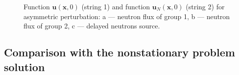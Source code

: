 \documentclass[authoryear]{elsarticle}
\begin{document}
\begin{figure}[!h]
\begin{center}
\begin{minipage}{0.3\linewidth}
 \\
\end{minipage}

\begin{minipage}{0.051\linewidth}
\center{~} \\
\end{minipage}
\hfill
\begin{minipage}{0.3\linewidth}
 \\
\end{minipage}
\hfill
\begin{minipage}{0.3\linewidth}
 \\
\end{minipage}
\hfill
\begin{minipage}{0.3\linewidth}
 \\
\end{minipage}
\hfill

\caption{Function $\bm u(\bm x, 0)$ (string 1) and function  $\bm u_N(\bm x, 0)$ (string 2) for asymmetric perturbation:
a --- neutron flux of group 1, b --- neutron flux of group 2, c --- delayed neutrons source.}
\label{fig:13}
  \end{center}
\end{figure}

\subsection{Comparison with the nonstationary problem solution} 
\end{document}
